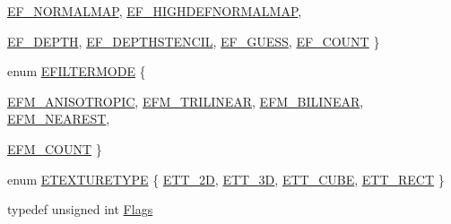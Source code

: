 \begin{CompactItemize}
\hyperlink{class_gr_texture_base_82c606022e93566ba55fe4cd3beb687c1775e1ba3426990f650c54815621c86d}{EF\_\-NORMALMAP}, 
\hyperlink{class_gr_texture_base_82c606022e93566ba55fe4cd3beb687cfb1681fdea644264aedeef91c0b7d337}{EF\_\-HIGHDEFNORMALMAP}, 
\par
\hyperlink{class_gr_texture_base_82c606022e93566ba55fe4cd3beb687c71c05f345db0275987ed93102b755f7a}{EF\_\-DEPTH}, 
\hyperlink{class_gr_texture_base_82c606022e93566ba55fe4cd3beb687c129f8287ab0fb19826d05cc209d66c3d}{EF\_\-DEPTHSTENCIL}, 
\hyperlink{class_gr_texture_base_82c606022e93566ba55fe4cd3beb687c983e954e5c478c1cd15fff916318eeb7}{EF\_\-GUESS}, 
\hyperlink{class_gr_texture_base_82c606022e93566ba55fe4cd3beb687cc56be62e2bf809843d2063611fdea94f}{EF\_\-COUNT}
 \}
\item 
enum \hyperlink{class_gr_texture_base_6220382496bf0115188ee6d9d70f5b5d}{EFILTERMODE} \{ \par
\hyperlink{class_gr_texture_base_6220382496bf0115188ee6d9d70f5b5dca410d338eb019d221b8cb0b49c66565}{EFM\_\-ANISOTROPIC}, 
\hyperlink{class_gr_texture_base_6220382496bf0115188ee6d9d70f5b5d06bb4059e46b00716b01397aa396af85}{EFM\_\-TRILINEAR}, 
\hyperlink{class_gr_texture_base_6220382496bf0115188ee6d9d70f5b5d521a33bd1061e944ae2a1f497b9a289d}{EFM\_\-BILINEAR}, 
\hyperlink{class_gr_texture_base_6220382496bf0115188ee6d9d70f5b5dd6b48555a143c7cf1edf0e27cf0eb2c4}{EFM\_\-NEAREST}, 
\par
\hyperlink{class_gr_texture_base_6220382496bf0115188ee6d9d70f5b5d854951f07817aceb62271cd05ea97d99}{EFM\_\-COUNT}
 \}
\item 
enum \hyperlink{class_gr_texture_base_5ce3676de03c3c565a9a0995334e5308}{ETEXTURETYPE} \{ \hyperlink{class_gr_texture_base_5ce3676de03c3c565a9a0995334e5308d02dc086ce7c780adab8a7bb57a1bb19}{ETT\_\-2D}, 
\hyperlink{class_gr_texture_base_5ce3676de03c3c565a9a0995334e5308758cc3ff79fc0537dd876f080ce55c59}{ETT\_\-3D}, 
\hyperlink{class_gr_texture_base_5ce3676de03c3c565a9a0995334e53085a491542d9caa5f9543b500942b7b5a6}{ETT\_\-CUBE}, 
\hyperlink{class_gr_texture_base_5ce3676de03c3c565a9a0995334e53088892a7cf7ff8a3e99d9fafdb3c0191c6}{ETT\_\-RECT}
 \}
\item 
typedef unsigned int \hyperlink{class_gr_texture_base_bee6ecbc7a70ea5f2acab8341a9696b5}{Flags}

\end{CompactItemize}
